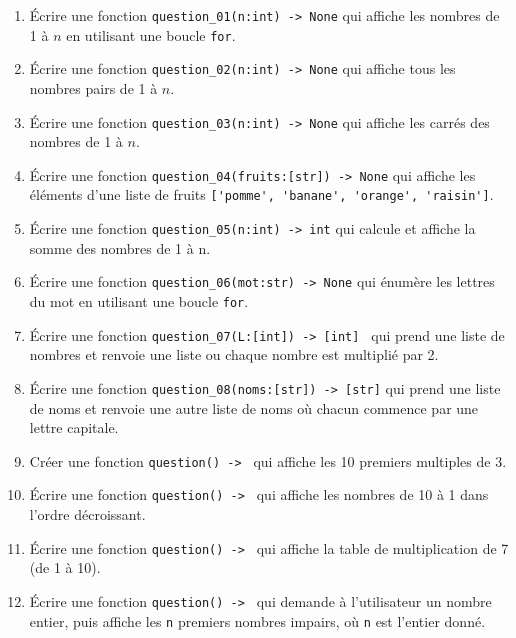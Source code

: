 
\begin{enumerate}

    \item Écrire une fonction \lstinline{question_01(n:int) -> None} qui affiche les nombres de 1 à $n$ en utilisant une boucle \lstinline{for}.

    \item Écrire une fonction \lstinline{question_02(n:int) -> None} qui affiche tous les nombres pairs de 1 à $n$.

    \item Écrire une fonction \lstinline{question_03(n:int) -> None} qui affiche les carrés des nombres de 1 à $n$.

    \item Écrire une fonction \lstinline{question_04(fruits:[str]) -> None} qui affiche les éléments d'une liste de fruits \lstinline{['pomme', 'banane', 'orange', 'raisin']}.

    \item Écrire une fonction \lstinline{question_05(n:int) -> int} qui calcule et affiche la somme des nombres de 1 à n.

    \item Écrire une fonction \lstinline{question_06(mot:str) -> None} qui énumère les lettres du mot en utilisant une boucle \lstinline{for}.

    \item Écrire une fonction \lstinline{question_07(L:[int]) -> [int] } qui prend une liste de nombres et renvoie une liste ou chaque nombre est multiplié par 2.

    \item Écrire une fonction \lstinline{question_08(noms:[str]) -> [str]} qui prend une liste de noms et renvoie une autre liste de noms où chacun commence par une lettre capitale.

    \item Créer une fonction \lstinline{question() -> } qui affiche les 10 premiers multiples de 3.

    \item Écrire une fonction \lstinline{question() -> } qui affiche les nombres de 10 à 1 dans l'ordre décroissant.

    \item Écrire une fonction \lstinline{question() -> } qui affiche la table de multiplication de 7 (de 1 à 10).

    \item Écrire une fonction \lstinline{question() -> } qui demande à l'utilisateur un nombre entier, puis affiche les \lstinline{n} premiers nombres impairs, où \lstinline{n} est l'entier donné.


\end{enumerate}
